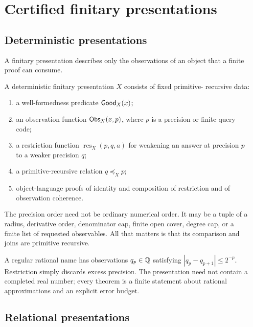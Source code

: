 \section{Certified finitary presentations}

\subsection{Deterministic presentations}

A finitary presentation describes only the observations of an object that a
finite proof can consume.

\begin{definition}
A deterministic finitary presentation \(X\) consists of fixed primitive-
recursive data:
\begin{enumerate}
\item a well-formedness predicate \(\mathsf{Good}_X(x)\);
\item an observation function \(\mathsf{Obs}_X(x,p)\), where \(p\) is a precision or
finite query code;
\item a restriction function \(\operatorname{res}_X(p,q,a)\) for weakening an
answer at precision \(p\) to a weaker precision \(q\);
\item a primitive-recursive relation \(q\preceq_X p\);
\item object-language proofs of identity and composition of restriction and of
observation coherence.
\end{enumerate}
\end{definition}

The precision order need not be ordinary numerical order.  It may be a tuple
of a radius, derivative order, denominator cap, finite open cover, degree cap,
or a finite list of requested observables.  All that matters is that its
comparison and joins are primitive recursive.

\begin{example}
A regular rational name has observations \(q_p\in\mathbb Q\) satisfying
\(|q_p-q_{p+1}|\le 2^{-p}\).  Restriction simply discards excess precision.
The presentation need not contain a completed real number; every theorem is a
finite statement about rational approximations and an explicit error budget.
\end{example}

\subsection{Relational presentations}


